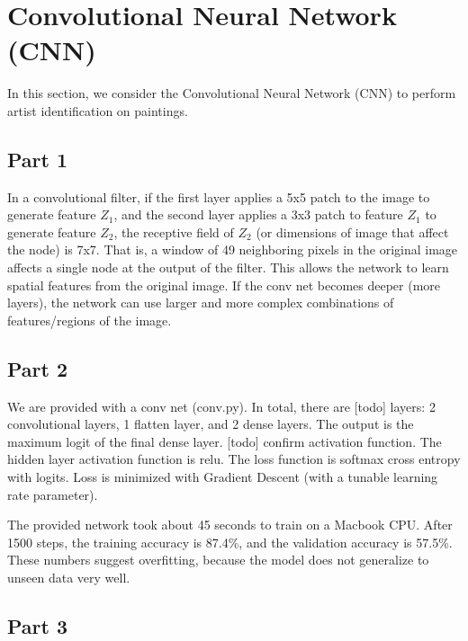 \section{Convolutional Neural Network (CNN)} \label{sec:prob2}
In this section, we consider the Convolutional Neural Network (CNN) to perform artist identification on paintings.

\subsection{Part 1}
In a convolutional filter, if the first layer applies a 5x5 patch to the image to generate feature $Z_1$, and the second layer applies a 3x3 patch to feature $Z_1$ to generate feature $Z_2$, the receptive field of $Z_2$ (or dimensions of image that affect the node) is 7x7.
That is, a window of 49 neighboring pixels in the original image affects a single node at the output of the filter.
This allows the network to learn spatial features from the original image.
If the conv net becomes deeper (more layers), the network can use larger and more complex combinations of features/regions of the image.

\subsection{Part 2}
We are provided with a conv net (conv.py).
In total, there are [todo] layers: 2 convolutional layers, 1 flatten layer, and 2 dense layers.
The output is the maximum logit of the final dense layer.
[todo] confirm activation function. The hidden layer activation function is relu.
The loss function is softmax cross entropy with logits.
Loss is minimized with Gradient Descent (with a tunable learning rate parameter).

The provided network took about 45 seconds to train on a Macbook CPU.
After 1500 steps, the training accuracy is 87.4\%, and the validation accuracy is 57.5\%.
These numbers suggest overfitting, because the model does not generalize to unseen data very well.

\subsection{Part 3}